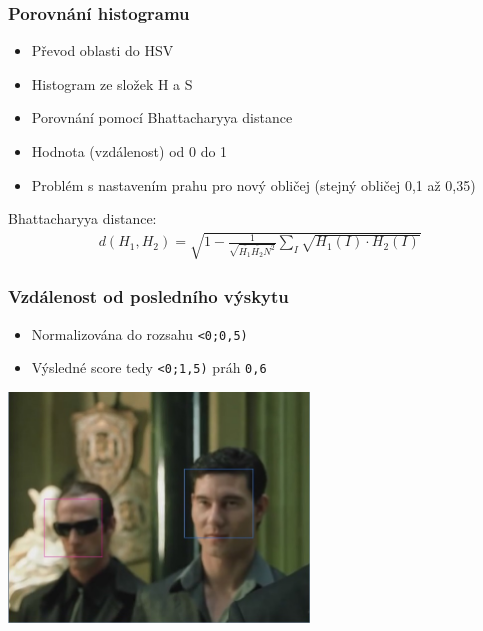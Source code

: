 \documentclass{beamer}
\begin{document}
	\begin{frame}[t,fragile]
		\frametitle{Porovnání histogramu}	
		
		\begin{itemize}
			\item Převod oblasti do HSV
			\item Histogram ze složek H a S
			\item Porovnání pomocí Bhattacharyya distance
			\item Hodnota (vzdálenost) od 0 do 1 
			\item Problém s nastavením prahu pro nový obličej (stejný obličej 0,1 až 0,35)
		\end{itemize}		
		
		Bhattacharyya distance:	
\begin{align}
d(H_{1},H_{2})=\sqrt{1-\frac{1}{\sqrt{\overline{H_{1}}\overline{H_{2}}N^2}}\sum\limits_{I}\sqrt{H_{1}(I) \cdot H_{2}(I)}}
\end{align}

	\end{frame}				
	
	\begin{frame}[t,fragile]
		\frametitle{Vzdálenost od posledního výskytu}	
		
		\begin{itemize}
			\item Normalizována do rozsahu \verb|<0;0,5)|
			\item Výsledné score tedy \verb|<0;1,5)| práh \verb|0,6|
		\end{itemize}
		\centering\includegraphics[width=8cm]{img/Persons.jpg}
		
					
	\end{frame}			
	
	
\end{document}
